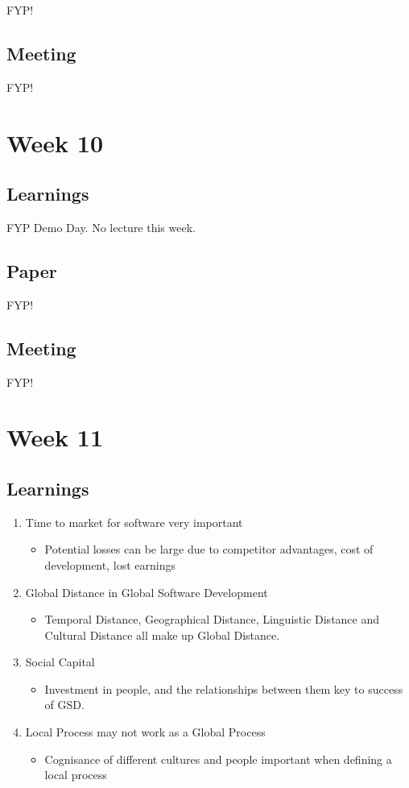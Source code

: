 FYP!

\section{Meeting}

FYP!

\chapter{Week 10}

\section{Learnings}

FYP Demo Day. No lecture this week.

\section{Paper}

FYP!

\section{Meeting}

FYP!

\chapter{Week 11}

\section{Learnings}
\begin{enumerate}
\item Time to market for software very important
\begin{itemize}
\item Potential losses can be large due to competitor advantages, cost of development, lost earnings
\end{itemize}
\item Global Distance in Global Software Development
\begin{itemize}
\item Temporal Distance, Geographical Distance, Linguistic Distance and Cultural Distance all make up Global Distance. 
\end{itemize}
\item Social Capital
\begin{itemize}
\item Investment in people, and the relationships between them key to success of GSD. 
\end{itemize}
\item Local Process may not work as a Global Process
\begin{itemize}
\item Cognisance of different cultures and people important when defining a local process
\end{itemize}
\end{enumerate}

